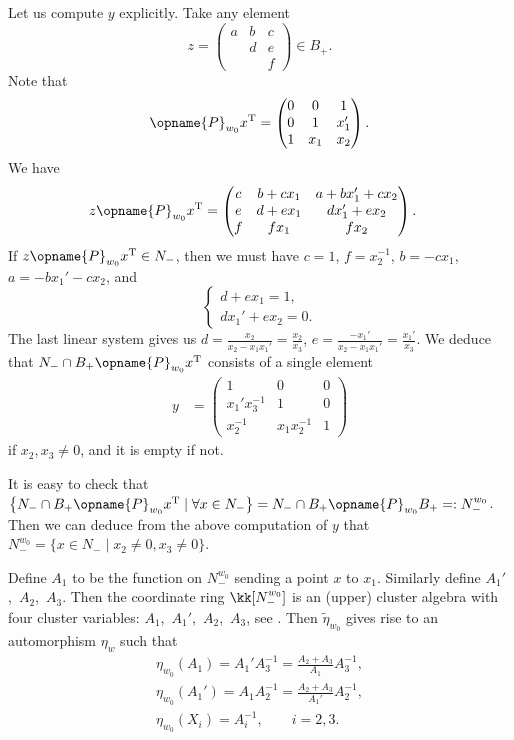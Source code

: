 \documentclass[pdftex]{sigma}
\newcommand{\trans}{\opname{P}}
\numberwithin{equation}{section}
\begin{document}
\begin{Example}
Let us compute $y$ explicitly. Take any element \[z=\begin{pmatrix}
a & b & c\\
 & d & e\\
 & & f
\end{pmatrix}\in B_{+}.\] Note that \[\trans_{w_{0}}x^{\rm T}=\begin{pmatrix}
0 & 0 & 1\\
0 & 1 & x_{1}'\\
1 & x_{1} & x_{2}
\end{pmatrix}.\] We have
\begin{align*}
z\trans_{w_{0}}x^{\rm T} & =\begin{pmatrix}
c & b+cx_{1} & a+bx_{1}'+cx_{2}\\
e & d+ex_{1} & dx_{1}'+ex_{2}\\
f & fx_{1} & fx_{2}
\end{pmatrix}.
\end{align*}
If $z\trans_{w_{0}}x^{\rm T}\in N_{-}$, then we must have $c=1$, $f=x_{2}^{-1}$,
$b=-cx_{1}$, $a=-bx_{1}'-cx_{2}$, and \[\begin{cases}
d+ex_{1} =1,\\
dx_{1}'+ex_{2} =0.
\end{cases} \] The last linear system gives us $d=\frac{x_{2}}{x_{2}-x_{1}x_{1}'}=\frac{x_{2}}{x_{3}}$,
$e=\frac{-x_{1}'}{x_{2}-x_{1}x_{1}'}=\frac{x_{1}'}{x_{3}}$. We deduce
that $N_{-}\cap B_{+}\trans_{w_{0}}x^{\rm T}$ consists of a single element
\begin{align*}
y & =\begin{pmatrix}
1 & 0 & 0\\
x_{1}'x_{3}^{-1} & 1 & 0\\
x_{2}^{-1} & x_{1}x_{2}^{-1} & 1
\end{pmatrix}
\end{align*}
if $x_{2},x_{3}\neq0$, and it is empty if not.

It is easy to check that $\big\{N_{-}\cap B_{+}\trans_{w_{0}}x^{\rm T}\mid \forall x\in N_{-}\big\}=N_{-}\cap B_{+}\trans_{w_{0}}B_{+}=:N_{-}^{w_{0}}$.
Then we can deduce from the above computation of $y$ that $N_{-}^{w_{0}}=\{x\in N_{-}\mid x_{2}\neq0,x_{3}\neq0\}$.

Define $A_{1}$ to be the function on $N_{-}^{w_{0}}$ sending a point
$x$ to $x_{1}$. Similarly define $A_{1}'$,~$A_{2}$,~$A_{3}$.
Then the coordinate ring $\kk[N_{-}^{w_{0}}]$ is an (upper) cluster
algebra with four cluster variables: $A_{1}$,~$A_{1}'$,~$A_{2}$,~$A_{3}$, see \cite[Example~2.2]{qin2021cluster}. Then $\tilde{\eta}_{w_{0}}$
gives rise to an automorphism $\eta_{w}$ such that
\begin{gather*}
\eta_{w_{0}}(A_{1}) =A_{1}'A_{3}^{-1}=\frac{A_{2}+A_{3}}{A_{1}}A_{3}^{-1},\\
\eta_{w_{0}}(A_{1}') =A_{1}A_{2}^{-1}=\frac{A_{2}+A_{3}}{A_{1}'}A_{2}^{-1},\\
\eta_{w_{0}}(X_{i}) =A_{i}^{-1},\qquad i=2,3.
\end{gather*}
\end{Example}
\end{document}

